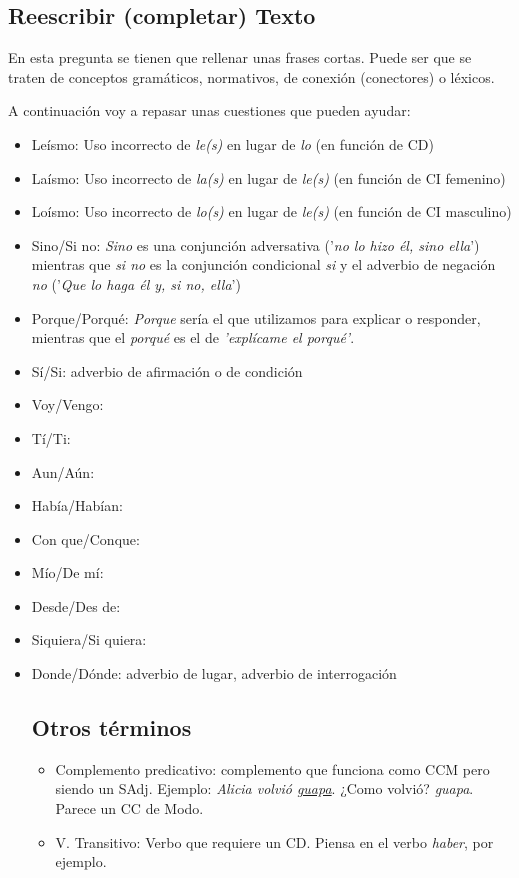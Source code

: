 \documentclass[arial,a4paper,print]{article}
\begin{document}
\pagebreak

\subsection{Reescribir (completar) Texto}
En esta pregunta se tienen que rellenar unas frases cortas. Puede ser que se traten de conceptos gramáticos, normativos, de conexión (conectores) o léxicos. 

A continuación voy a repasar unas cuestiones que pueden ayudar:
\begin{itemize}
	
\item Leísmo: Uso incorrecto de \textit{le(s)} en lugar de \textit{lo} (en función de CD)
\item Laísmo: Uso incorrecto de \textit{la(s)} en lugar de \textit{le(s)} (en función de CI femenino)
\item Loísmo: Uso incorrecto de \textit{lo(s)} en lugar de \textit{le(s)} (en función de CI masculino)
\item Sino/Si no: \textit{Sino} es una conjunción adversativa ('\textit{no lo hizo él, sino ella}') mientras que \textit{si no} es la conjunción condicional \textit{si} y el adverbio de negación \textit{no} ('\textit{Que lo haga él y, si no, ella}')
\item Porque/Porqué: \textit{Porque} sería el que utilizamos para explicar o responder, mientras que el \textit{porqué} es el de \textit{'explícame el porqué'}. 
\item Sí/Si: adverbio de afirmación o de condición 
\item Voy/Vengo: 
\item Tí/Ti:
\item Aun/Aún: 
\item Había/Habían:
\item Con que/Conque: 
\item Mío/De mí: 
\item Desde/Des de:
\item Siquiera/Si quiera:
\item Donde/Dónde: adverbio de lugar, adverbio de interrogación 


\subsection{Otros términos}
\begin{itemize}

\item Complemento predicativo: complemento que funciona como CCM pero siendo un SAdj. Ejemplo: \textit{Alicia volvió \underline{guapa}}. ¿Como volvió? \textit{guapa}. Parece un CC de Modo.  
\item V. Transitivo: Verbo que requiere un CD. Piensa en el verbo \textit{haber}, por ejemplo. 

\end{itemize}


	
\end{itemize}
	
\end{document}
